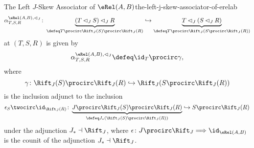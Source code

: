 \begin{definition}{The Left $J$-Skew Associator of $\eRel(A,B)$}{the-left-j-skew-associator-of-erelab}
    \[
        \alpha^{\eRel(A,B),\lhd_{J}}_{T,S,R}%
        \colon%
        \underbrace{(T\lhd_{J}S)\lhd_{J}R}_{\defeq T\procirc\Rift_{J}(S)\procirc\Rift_{J}(R)}%
        \hookrightarrow
        \underbrace{T\lhd_{J}(S\lhd_{J}R)}_{\defeq T\procirc\Rift_{J}(S\procirc\Rift_{J}(R))}%
    \]%
    at $(T,S,R)$ is given by
    \[
        \alpha^{\eRel(A,B),\lhd_{J}}_{T,S,R}%
        \defeq%
        \id_{T}\procirc\gamma,
    \]%
    where
    \[
        \gamma%
        \colon%
        \Rift_{J}(S)\procirc\Rift_{J}(R)
        \hookrightarrow
        \Rift_{J}(S\procirc\Rift_{J}(R))
    \]%
    is the inclusion adjunct to the inclusion
    \[
        \epsilon_{S}\twocirc\id_{\Rift_{J}(R)}
        \colon
        \underbrace{J\procirc\Rift_{J}(S)\procirc\Rift_{J}(R)}_{\defeq J_{*}(\Rift_{J}(S)\procirc\Rift_{J}(R))}
        \hookrightarrow
        S\procirc\Rift_{J}(R)
    \]%
    under the adjunction $J_{*}\dashv\Rift_{J}$, where $\epsilon\colon{J\procirc\Rift_{J}}\Longrightarrow\id_{\eRel(A,B)}$ is the counit of the adjunction $J_{*}\dashv\Rift_{J}$.
\end{definition}
